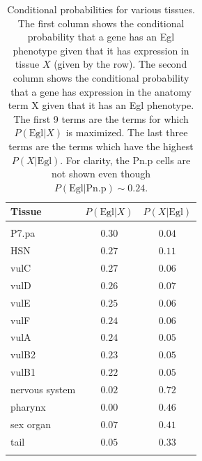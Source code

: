 \documentclass[10pt,letterpaper,twocolumn]{article}
\newcommand{\ra}[1]{\renewcommand{\arraystretch}{#1}}
\begin{document}
\begin{table}
  \renewcommand{\familydefault}{\sfdefault}\normalfont{}
  \centering{}
  \ra{1.3}
  \caption{Conditional probabilities for various tissues. The
  first column shows the conditional probability that a gene has an Egl
  phenotype given that it has expression in tissue $X$ (given by the row).
  The second column shows the conditional probability that a gene has expression
  in the anatomy term X given that it has an Egl phenotype. The first 9 terms
  are the terms for which $P(\text{Egl}|X)$ is maximized. The last three terms
  are the terms which have the highest $P(X|\text{Egl})$. For clarity, the Pn.p
  cells are not shown even though $P(\text{Egl}|\text{Pn.p})\sim 0.24$.}

  \begin{tabular}{@{}lcc@{}}
  \toprule{}
  Tissue & $P(\text{Egl}| X)$ & $P(X|\text{Egl})$\\
  \bottomrule{}\\
  P7.pa & $0.30$ & $0.04$\\
  HSN & $0.27$ & $0.11$\\
  vulC & $0.27$ & $0.06$\\
  vulD & $0.26$ & $0.07$\\
  vulE & $0.25$ & $0.06$\\
  vulF & $0.24$ & $0.06$\\
  vulA & $0.24$ & $0.05$\\
  vulB2 & $0.23$ & $0.05$\\
  vulB1 & $0.22$ & $0.05$\\
  nervous system & $0.02$ & $0.72$ \\
  pharynx  & $0.00$ & $0.46$\\
  sex organ & $0.07$ & $0.41$\\
  tail & $0.05$ & $0.33$\\
  \bottomrule{}
  \end{tabular}
\label{tab:cond_probs}
\end{table}
\end{document}
